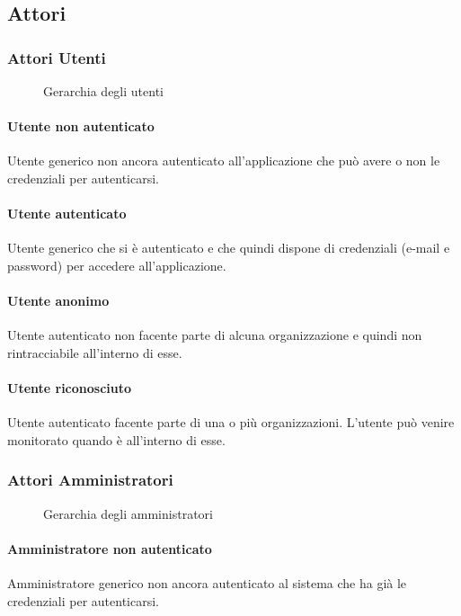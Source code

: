 \subsection{Attori}
\subsubsection{Attori Utenti}

\begin{figure}[h]
  \caption{Gerarchia degli utenti}
  \centering
\end{figure}

\paragraph{Utente non autenticato}
Utente generico non ancora autenticato all'applicazione che può avere o non le credenziali per autenticarsi.
\paragraph{Utente autenticato}
Utente generico che si è autenticato e che quindi dispone di credenziali (e-mail e password) per accedere all'applicazione.
\paragraph{Utente anonimo}
Utente autenticato non facente parte di alcuna organizzazione e quindi non rintracciabile all'interno di esse.
\paragraph{Utente riconosciuto}
Utente autenticato facente parte di una o più organizzazioni.
L'utente può venire monitorato quando è all'interno di esse.



\subsubsection{Attori Amministratori}
\begin{figure}[h]
  \caption{Gerarchia degli amministratori}
  \centering
\end{figure}


\paragraph{Amministratore non autenticato}
Amministratore generico non ancora autenticato al sistema che ha già le credenziali per autenticarsi.
